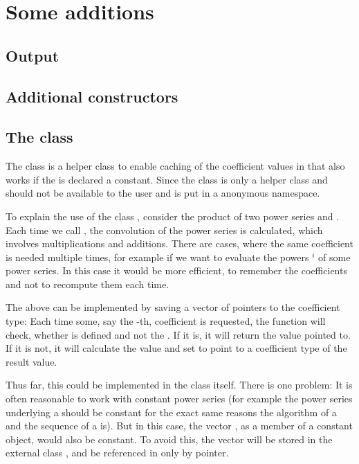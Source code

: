 \section{Some additions}

\subsection{Output}

\subsection{Additional constructors}

\subsection{The class }

The class  is a helper class to enable caching of the coefficient values in  that also works if the  is declared a constant. Since the class  is only a helper class and should not be available to the user and is put in a anonymous namespace.

To explain the use of the class , consider the product  of two power series  and . Each time we call , the convolution of the power series is calculated, which involves  multiplications and  additions. There are cases, where the same coefficient is needed multiple times, for example if we want to evaluate the powers $^i$ of some power series. In this case it would be more efficient, to remember the coefficients and not to recompute them each time.

The above can be implemented by saving a vector  of pointers to the coefficient type: Each time some, say the -th, coefficient is requested, the function  will check, whether  is defined and not the \NULL. If it is, it will return the value pointed to. If it is not, it will calculate the value and set  to point to a coefficient type of the result value.

Thus far, this could be implemented in the class  itself. There is one problem: It is often reasonable to work with constant power series (for example the power series underlying a  should be constant for the exact same reasons the algorithm of a  and the sequence of a  is). But in this case, the vector , as a member of a constant object, would also be constant. To avoid this, the vector will be stored in the external class , and be referenced in  only by pointer.

